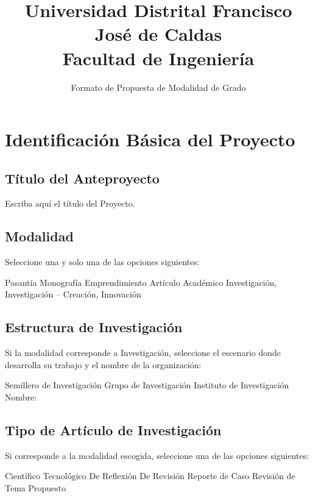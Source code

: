 \documentclass{article}
\title{Universidad Distrital Francisco José de Caldas \\ Facultad de Ingeniería}
\author{Formato de Propuesta de Modalidad de Grado}
\begin{document}
\maketitle

\section*{\sc Identificación Básica del Proyecto}
\subsection*{Título del Anteproyecto}
\noindent Escriba aquí el título del Proyecto.

\subsection*{Modalidad}
\noindent Seleccione una y solo una de las opciones siguientes:  

\medskip \noindent Pasantía  \quad Monografía  \quad Emprendimiento  \quad  Artículo Académico  \quad Investigación, Investigación -- Creación, Innovación 

\subsection*{Estructura de Investigación}
\noindent Si la modalidad corresponde a Investigación, seleccione el escenario donde desarrolla su trabajo y el nombre de la organización:

\medskip \noindent Semillero de Investigación  \quad Grupo de Investigación  \quad Instituto de Investigación  \quad Nombre: 

\subsection*{Tipo de Artículo de Investigación}
\noindent Si corresponde a la modalidad escogida, seleccione una de las opciones siguientes:

\medskip \noindent Científico  \quad Tecnológico  \quad De Reflexión  \quad De Revisión  \quad Reporte de Caso  \quad Revisión de Tema Propuesto 
\end{document}
